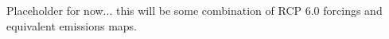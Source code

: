 Placeholder for now... this will be some combination of RCP 6.0 forcings and equivalent emissions maps.